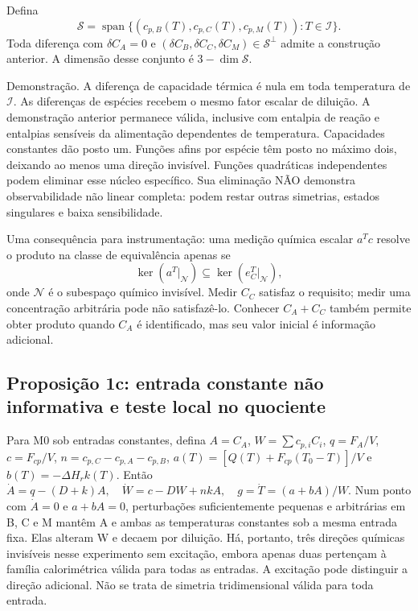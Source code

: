 \documentclass[
  11pt,
]{article}
\begin{document}
Defina
\[\mathcal S=\operatorname{span}\{(c_{p,B}(T),c_{p,C}(T),c_{p,M}(T)):T\in\mathcal I\}.\]
Toda diferença com \(\delta C_A=0\) e
\((\delta C_B,\delta C_C,\delta C_M)\in\mathcal S^\perp\) admite a
construção anterior. A dimensão desse conjunto é \(3-\dim\mathcal S\).

Demonstração. A diferença de capacidade térmica é nula em toda
temperatura de \(\mathcal I\). As diferenças de espécies recebem o mesmo
fator escalar de diluição. A demonstração anterior permanece válida,
inclusive com entalpia de reação e entalpias sensíveis da alimentação
dependentes de temperatura. Capacidades constantes dão posto um. Funções
afins por espécie têm posto no máximo dois, deixando ao menos uma
direção invisível. Funções quadráticas independentes podem eliminar esse
núcleo específico. Sua eliminação NÃO demonstra observabilidade não
linear completa: podem restar outras simetrias, estados singulares e
baixa sensibilidade.

Uma consequência para instrumentação: uma medição química escalar
\(a^Tc\) resolve o produto na classe de equivalência apenas se
\[\ker(a^T|_{\mathcal N})\subseteq\ker(e_C^T|_{\mathcal N}),\] onde
\(\mathcal N\) é o subespaço químico invisível. Medir \(C_C\) satisfaz o
requisito; medir uma concentração arbitrária pode não satisfazê-lo.
Conhecer \(C_A+C_C\) também permite obter produto quando \(C_A\) é
identificado, mas seu valor inicial é informação adicional.

\hypertarget{proposiuxe7uxe3o-1c-entrada-constante-nuxe3o-informativa-e-teste-local-no-quociente}{%
\subsection{Proposição 1c: entrada constante não informativa e teste
local no
quociente}\label{proposiuxe7uxe3o-1c-entrada-constante-nuxe3o-informativa-e-teste-local-no-quociente}}

Para M0 sob entradas constantes, defina \(A=C_A\),
\(W=\sum c_{p,i}C_i\), \(q=F_A/V\), \(c=F_{cp}/V\),
\(n=c_{p,C}-c_{p,A}-c_{p,B}\), \(a(T)=[Q(T)+F_{cp}(T_0-T)]/V\) e
\(b(T)=-\Delta H_r k(T)\). Então
\(\dot A=q-(D+k)A,\quad\dot W=c-DW+nkA,\quad g=\dot T=(a+bA)/W.\) Num
ponto com \(\dot A=0\) e \(a+bA=0\), perturbações suficientemente
pequenas e arbitrárias em B, C e M mantêm A e ambas as temperaturas
constantes sob a mesma entrada fixa. Elas alteram W e decaem por
diluição. Há, portanto, três direções químicas invisíveis nesse
experimento sem excitação, embora apenas duas pertençam à família
calorimétrica válida para todas as entradas. A excitação pode distinguir
a direção adicional. Não se trata de simetria tridimensional válida para
toda entrada.
\end{document}
